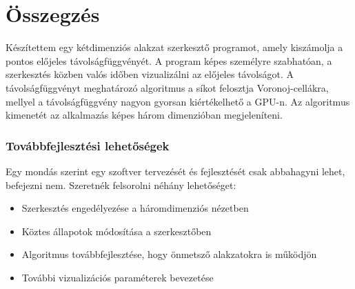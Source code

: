\chapter{Összegzés}
\label{ch:sum}


Készítettem egy kétdimenziós alakzat szerkesztő programot, amely kiszámolja a pontos előjeles távolságfüggvényét. A program képes személyre szabhatóan, a szerkesztés közben valós időben vizualizálni az előjeles távolságot. A távolságfüggvényt meghatározó algoritmus a síkot felosztja Voronoj-cellákra, mellyel a távolságfüggvény nagyon gyorsan kiértékelhető a GPU-n. Az algoritmus kimenetét az alkalmazás képes három dimenzióban megjeleníteni.


\subsection{Továbbfejlesztési lehetőségek}

Egy mondás szerint egy szoftver tervezését és fejlesztését csak abbahagyni lehet, befejezni nem. Szeretnék felsorolni néhány lehetőséget:

\begin{itemize}
    \item Szerkesztés engedélyezése a háromdimenziós nézetben
    \item Köztes állapotok módosítása a szerkesztőben
    \item Algoritmus továbbfejlesztése, hogy önmetsző alakzatokra is működjön
    \item További vizualizációs paraméterek bevezetése
\end{itemize}
